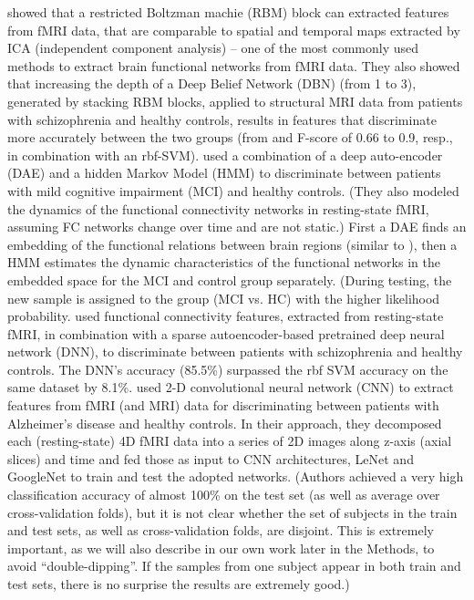 \documentclass{article} %
\begin{document}
\citet{Plis14} showed that a restricted Boltzman machie (RBM) block \citep{Hinton2002} can extracted features from fMRI data, that are comparable to spatial and temporal maps extracted by ICA (independent component analysis) – one of the most commonly used methods to extract brain functional networks from fMRI data. They also showed that increasing the depth of a Deep Belief Network (DBN) \citep{Hinton06} (from 1 to 3), generated by stacking RBM blocks, applied to structural MRI data from patients with schizophrenia and healthy controls, results in features that discriminate more accurately between the two groups (from and F-score of 0.66 to 0.9, resp., in combination with an rbf-SVM). 
\citet{Suk2016} used a combination of a deep auto-encoder (DAE) and a hidden Markov Model (HMM) to discriminate between patients with mild cognitive impairment (MCI) and healthy controls. (They also modeled the dynamics of the functional connectivity networks in resting-state fMRI, assuming FC networks change over time and are not static.) First a DAE finds an embedding of the functional relations between brain regions (similar to \citep{Plis2014}), then a HMM estimates the dynamic characteristics of the functional networks in the embedded space for the MCI and control group separately. (During testing, the new sample is assigned to the group (MCI vs. HC) with the higher likelihood probability. \citet{Kim2016} used functional connectivity features, extracted from resting-state fMRI, in combination with a sparse autoencoder-based pretrained deep neural network (DNN), to discriminate between patients with schizophrenia and healthy controls. The DNN’s accuracy (85.5\%) surpassed the rbf SVM accuracy on the same dataset by 8.1\%. \citet{Sarraf2016} used 2-D convolutional neural network (CNN) to extract features from fMRI (and MRI) data for discriminating between patients with Alzheimer’s disease and healthy controls. In their approach, they decomposed each (resting-state) 4D fMRI data into a series of 2D images along z-axis (axial slices) and time and fed those as input to CNN architectures, LeNet \citep{LeCunn1998} and GoogleNet \citep{Szegedy2015} to train and test the adopted networks. (Authors achieved a very high classification accuracy of almost 100\% on the test set (as well as average over cross-validation folds), but it is not clear whether the set of subjects in the train and test sets, as well as cross-validation folds, are disjoint. This is extremely important, as we will also describe in our own work later in the Methods, to avoid “double-dipping”. If the samples from one subject appear in both train and test sets, there is no surprise the results are extremely good.) 
\end{document}
